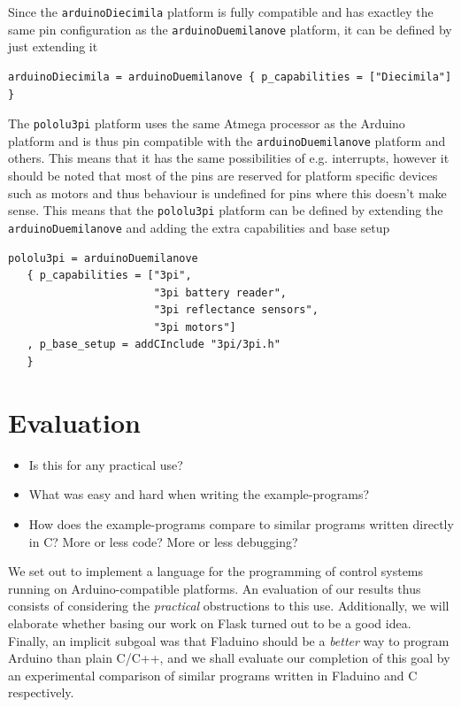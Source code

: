 \documentclass[a4paper, oneside, final]{memoir}
\begin{document}
Since the \texttt{arduinoDiecimila} platform is fully compatible and has
exactley the same pin configuration as the \texttt{arduinoDuemilanove} platform,
it can be defined by just extending it

\begin{verbatim}
arduinoDiecimila = arduinoDuemilanove { p_capabilities = ["Diecimila"] }
\end{verbatim}

The \texttt{pololu3pi} platform uses the same Atmega processor as the Arduino
platform and is thus pin compatible with the \texttt{arduinoDuemilanove}
platform and others. This means that it has the same possibilities of e.g.
interrupts, however it should be noted that most of the pins are reserved
\cite{3pi_pin_mapping} for platform specific devices such as motors and thus
behaviour is undefined for pins where this doesn't make sense. This means that
the \texttt{pololu3pi} platform can be defined by extending the
\texttt{arduinoDuemilanove} and adding the extra capabilities and base setup

\begin{verbatim}
pololu3pi = arduinoDuemilanove 
   { p_capabilities = ["3pi", 
                       "3pi battery reader", 
                       "3pi reflectance sensors",
                       "3pi motors"]
   , p_base_setup = addCInclude "3pi/3pi.h"
   }
\end{verbatim}



\chapter{Evaluation}
\label{chap:evaluation}

\begin{itemize}
\item Is this for any practical use?
\item What was easy and hard when writing the example-programs?
\item How does the example-programs compare to similar programs
  written directly in C? More or less code? More or less debugging?
\end{itemize}

We set out to implement a language for the programming of control
systems running on Arduino-compatible platforms.  An evaluation of our
results thus consists of considering the \textit{practical}
obstructions to this use.  Additionally, we will elaborate whether
basing our work on Flask turned out to be a good idea.  Finally, an
implicit subgoal was that Fladuino should be a \textit{better} way to
program Arduino than plain C/C++, and we shall evaluate our completion
of this goal by an experimental comparison of similar programs written
in Fladuino and C respectively.
\end{document}
